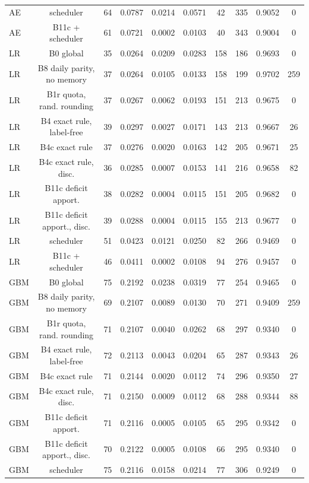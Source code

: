 \documentclass[10pt,onecolumn,letterpaper]{article}
\begin{document}
\begin{table}[!t]
{\begin{tabular}{lccccccccc}
AE & scheduler & 64 & 0.0787 & 0.0214 & 0.0571 & 42 & 335 & 0.9052 & 0 \\
AE & B11c + scheduler & 61 & 0.0721 & 0.0002 & 0.0103 & 40 & 343 & 0.9004 & 0 \\
LR & B0 global & 35 & 0.0264 & 0.0209 & 0.0283 & 158 & 186 & 0.9693 & 0 \\
LR & B8 daily parity, no memory & 37 & 0.0264 & 0.0105 & 0.0133 & 158 & 199 & 0.9702 & 259 \\
LR & B1r quota, rand. rounding & 37 & 0.0267 & 0.0062 & 0.0193 & 151 & 213 & 0.9675 & 0 \\
LR & B4 exact rule, label-free & 39 & 0.0297 & 0.0027 & 0.0171 & 143 & 213 & 0.9667 & 26 \\
LR & B4c exact rule & 37 & 0.0276 & 0.0020 & 0.0163 & 142 & 205 & 0.9671 & 25 \\
LR & B4c exact rule, disc. & 36 & 0.0285 & 0.0007 & 0.0153 & 141 & 216 & 0.9658 & 82 \\
LR & B11c deficit apport. & 38 & 0.0282 & 0.0004 & 0.0115 & 151 & 205 & 0.9682 & 0 \\
LR & B11c deficit apport., disc. & 39 & 0.0288 & 0.0004 & 0.0115 & 155 & 213 & 0.9677 & 0 \\
LR & scheduler & 51 & 0.0423 & 0.0121 & 0.0250 & 82 & 266 & 0.9469 & 0 \\
LR & B11c + scheduler & 46 & 0.0411 & 0.0002 & 0.0108 & 94 & 276 & 0.9457 & 0 \\
GBM & B0 global & 75 & 0.2192 & 0.0238 & 0.0319 & 77 & 254 & 0.9465 & 0 \\
GBM & B8 daily parity, no memory & 69 & 0.2107 & 0.0089 & 0.0130 & 70 & 271 & 0.9409 & 259 \\
GBM & B1r quota, rand. rounding & 71 & 0.2107 & 0.0040 & 0.0262 & 68 & 297 & 0.9340 & 0 \\
GBM & B4 exact rule, label-free & 72 & 0.2113 & 0.0043 & 0.0204 & 65 & 287 & 0.9343 & 26 \\
GBM & B4c exact rule & 71 & 0.2144 & 0.0020 & 0.0112 & 74 & 296 & 0.9350 & 27 \\
GBM & B4c exact rule, disc. & 71 & 0.2150 & 0.0009 & 0.0112 & 68 & 288 & 0.9344 & 88 \\
GBM & B11c deficit apport. & 71 & 0.2116 & 0.0005 & 0.0105 & 65 & 295 & 0.9342 & 0 \\
GBM & B11c deficit apport., disc. & 70 & 0.2122 & 0.0005 & 0.0108 & 66 & 295 & 0.9340 & 0 \\
GBM & scheduler & 75 & 0.2116 & 0.0158 & 0.0214 & 77 & 306 & 0.9249 & 0 \\

\end{tabular}}
\end{table}
\end{document}
